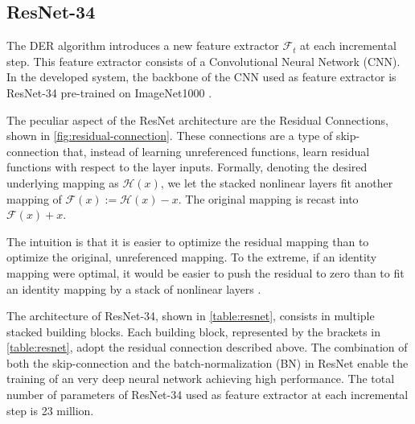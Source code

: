 \subsection{ResNet-34}
\label{sec:resnet}
The DER algorithm introduces a new feature extractor $\mathcal{F}_t$ at each incremental step. This feature extractor consists of a Convolutional Neural Network (CNN). In the developed system, the backbone of the CNN used as feature extractor is ResNet-34 \cite{he2016deep} pre-trained on ImageNet1000 \cite{deng2009imagenet}.

The peculiar aspect of the ResNet architecture are the Residual Connections, shown in \autoref{fig:residual-connection}. These connections are a type of skip-connection that, instead of learning unreferenced functions, learn residual functions with respect to the layer inputs. Formally, denoting the desired underlying mapping as $\mathcal{H}(x)$, we let the stacked nonlinear layers fit another mapping of $\mathcal{F}(x) := \mathcal{H}(x) - x$. The original mapping is recast into $\mathcal{F}(x) + x$. 

The intuition is that it is easier to optimize the residual mapping than to optimize the original, unreferenced mapping. To the extreme, if an identity mapping were optimal, it would be easier to push the residual to zero than to fit an identity mapping by a stack of nonlinear layers \cite{he2016deep}.

The architecture of ResNet-34, shown in \autoref{table:resnet}, consists in multiple stacked building blocks. Each building block, represented by the brackets in \autoref{table:resnet}, adopt the residual connection described above.
The combination of both the skip-connection and the batch-normalization (BN) \cite{ioffe2015batch} in ResNet enable the training of an very deep neural network achieving high performance.
The total number of parameters of ResNet-34 used as feature extractor at each incremental step is 23 million.

